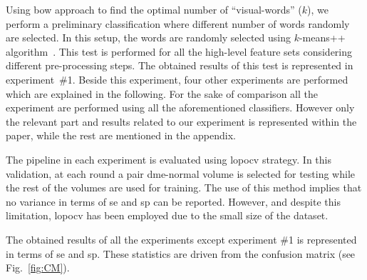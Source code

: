Using \ac{bow} approach to find the optimal number of ``visual-words'' ($k$), we perform a preliminary classification where different number of words randomly are selected.
In this setup, the words are randomly selected using $k$-means++ algorithm~\cite{arthur2007k}.
This test is performed for all the high-level feature sets considering different pre-processing steps.
The obtained results of this test is represented in experiment~\#1.
Beside this experiment, four other experiments are performed which are explained in the following.
For the sake of comparison all the experiment are performed using all the aforementioned classifiers.
However only the relevant part and results related to our experiment is represented within the paper, while the rest are mentioned in the appendix.

The pipeline in each experiment is evaluated using \ac{lopocv} strategy.
In this validation, at each round a pair \ac{dme}-normal volume is selected for testing while the rest of the volumes are used for training.
The use of this method implies that no variance in terms of \ac{se} and \ac{sp} can be reported.
However, and despite this limitation, \ac{lopocv} has been employed due to the small size of the dataset.

The obtained results of all the experiments except experiment \#1 is represented in terms of \ac{se} and \ac{sp}.
These statistics are driven from the confusion matrix (see Fig.~\ref{fig:CM}).

